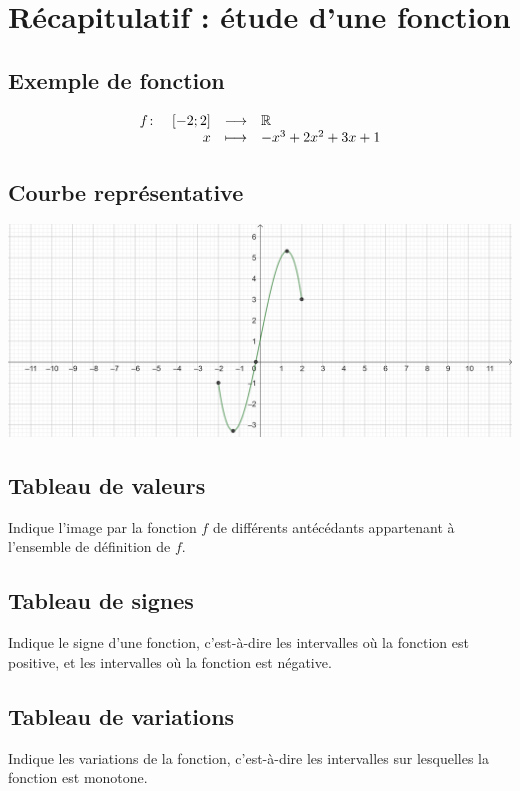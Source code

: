 \documentclass[poly]{mesCours}
\begin{document}
\section{Récapitulatif : étude d'une fonction}
\subsection*{Exemple de fonction}
\begin{equation*}
\begin{array}[t]{lrcl} f\colon & \left[-2;2\right] & \longrightarrow & \mathbb{R} \\ & x & \longmapsto & -x^3+2x^2+3x+1 \end{array}
\end{equation*}
\subsection*{Courbe représentative}
\begin{center}
\includegraphics[width=\textwidth]{Recapitulatif.png}
\end{center}
\subsection*{Tableau de valeurs}
Indique l'image par la fonction $f$ de différents antécédants appartenant à l'ensemble de définition de $f$.
\begin{center}
\end{center}
\subsection*{Tableau de signes}
Indique le signe d'une fonction, c'est-à-dire les intervalles où la fonction est positive, et les intervalles où la fonction est négative.
\begin{center}
\end{center}
\subsection*{Tableau de variations}
Indique les variations de la fonction, c'est-à-dire les intervalles sur lesquelles la fonction est monotone.
\begin{center}
\end{center}
\end{document}
